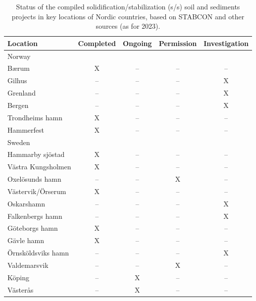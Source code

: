 \documentclass[sustainability,article,accept,pdftex,moreauthors]{Definitions/mdpi}
\begin{document}
\begin{table}[H]
\tablesize{\footnotesize}
\caption{Status %
 of the compiled solidification/stabilization (s/s) soil and sediments projects in key locations of Nordic countries, based on STABCON and other sources (as for 2023).} \label{tab01}
\begin{tabularx}{\textwidth}{m{3cm}<{\centering}CCCC}
\toprule \textbf{Location} & \textbf{Completed} & \textbf{Ongoing} & \textbf{Permission} & \textbf{Investigation} \\ \midrule 

Norway %
 &  &  &  &  \\
\midrule
Bærum & X %
 & -- %
 & -- & -- \\
Gilhus & -- & -- & -- & X\\
Grenland	& -- & -- & -- & X\\
Bergen & -- & -- & -- & X\\
Trondheims hamn & X & -- & -- & -- \\
Hammerfest & X & -- & -- & -- \\
\midrule
Sweden &  &  &  &  \\
\midrule
Hammarby sjöstad & X & -- & -- & -- \\
Västra Kungsholmen & X & -- & -- & -- \\
Oxelösunds hamn & --  & -- & X & -- \\
Västervik/Örserum & X & -- & -- & -- \\
Oskarshamn & -- & -- & -- & X \\
Falkenbergs hamn  & -- & -- & -- & X \\
Göteborgs hamn & X & -- & -- & -- \\
Gävle hamn & X & -- & -- & -- \\
Örnsköldsviks hamn & -- & -- & -- & X \\
Valdemarsvik & -- & -- & X & -- \\
Köping & -- & X & -- & -- \\
Västerås & -- & X & -- & -- \\

\end{tabularx}
\end{table}
\end{document}
